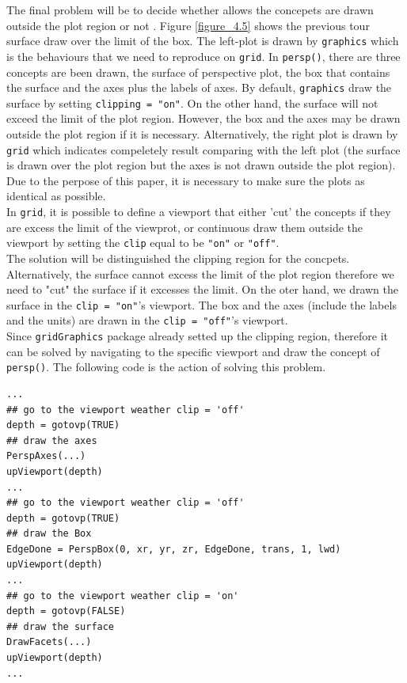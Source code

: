 \documentclass[paper=a4, fontsize=11pt]{report}
\begin{document}
The final problem will be to decide whether allows the concepets are drawn outside the plot region or not . Figure \ref{figure_4.5} shows the previous tour surface draw over the limit of the box. The left-plot is drawn by \texttt{graphics} which is the behaviours that we need to reproduce on \texttt{grid}. In \texttt{persp()}, there are three concepts are been drawn, the surface of perspective plot, the box that contains the surface and the axes plus the labels of axes. By default, \texttt{graphics} draw the surface by setting \texttt{clipping = "on"}. On the other hand, the surface will not exceed the limit of the plot region. However, the box and the axes may be drawn outside the plot region if it is necessary. Alternatively, the right plot is drawn by \texttt{grid} which indicates compeletely result comparing with the left plot (the surface is drawn over the plot region but the axes is not drawn outside the plot region). Due to the perpose of this paper, it is necessary to make sure the plots as identical as possible.\\
In \texttt{grid}, it is possible to define a viewport that either 'cut' the concepts if they are excess the limit of the viewprot, or continuous draw them outside the viewport by setting the \texttt{clip} equal to be \texttt{"on"} or \texttt{"off"}.\\
The solution will be distinguished the clipping region for the concpets. Alternatively, the surface cannot excess the limit of the plot region therefore we need to "cut" the surface if it excesses the limit. On the oter hand, we drawn the surface in the \texttt{clip = "on"}'s viewport. The box and the axes (include the labels and the units) are drawn in the \texttt{clip = "off"}'s viewport.\\
Since \texttt{gridGraphics} package already setted up the clipping region, therefore it can be solved by navigating to the specific viewport and draw the concept of \texttt{persp()}. The following code is the action of solving this problem.
\begin{lstlisting}
...
## go to the viewport weather clip = 'off'
depth = gotovp(TRUE)
## draw the axes
PerspAxes(...)
upViewport(depth)
...
## go to the viewport weather clip = 'off'
depth = gotovp(TRUE)
## draw the Box
EdgeDone = PerspBox(0, xr, yr, zr, EdgeDone, trans, 1, lwd)
upViewport(depth)
...
## go to the viewport weather clip = 'on'
depth = gotovp(FALSE)
## draw the surface
DrawFacets(...)
upViewport(depth)
...
\end{lstlisting}\\
\end{document}
